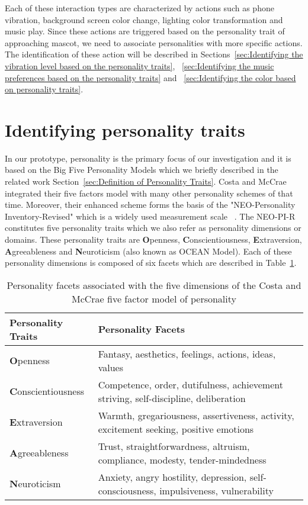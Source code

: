 Each of these interaction types are characterized by actions such as phone vibration,
background screen color change, lighting color transformation and music play.
Since these actions are triggered based on the personality trait of approaching mascot,
we need to associate personalities with more specific actions.
The identification of these action will be described in
Sections~\ref{sec:Identifying the vibration level based on the personality traits},
~\ref{sec:Identifying the music preferences based on the personality traits}
and ~\ref{sec:Identifying the color based on personality traits}.

\section{Identifying personality traits}
\label{sec:Identifying personality traits}

In our prototype, personality is the primary focus of our investigation and
it is based on the Big Five Personality Models which we briefly described
in the related work Section~\ref{sec:Definition of Personality Traits}.
Costa and McCrae integrated their five factors model with many other personality schemes of that time.
Moreover, their enhanced scheme forms the basis of the "NEO-Personality Inventory-Revised"
which is a widely used measurement scale ~\cite{costa2008revised}.
The NEO-PI-R constitutes five personality traits which we also refer as personality dimensions or domains.
These personality traits are \textbf{O}penness, \textbf{C}onscientiousness,
\textbf{E}xtraversion, \textbf{A}greeableness and \textbf{N}euroticism (also known as  OCEAN Model).
Each of these personality dimensions is composed of six facets which are described in Table~\ref{table:personality}.

\begin{table} [h]
\centering
\begin{tabular}{ | m{8em} | m{25em}| }
\hline
\textbf{Personality Traits} & \textbf{Personality Facets}  \\
\hline
\textbf{O}penness & Fantasy, aesthetics, feelings, actions, ideas, values  \\
\hline 
\textbf{C}onscientiousness & Competence, order, dutifulness, achievement striving, self-discipline, deliberation  \\
\hline 
\textbf{E}xtraversion & Warmth, gregariousness, assertiveness, activity, excitement seeking, positive emotions \\
\hline 
\textbf{A}greeableness & Trust, straightforwardness, altruism, compliance, modesty, tender-mindedness  \\
\hline 
\textbf{N}euroticism & Anxiety, angry hostility, depression, self-consciousness, impulsiveness, vulnerability \\
\hline
\end{tabular}
\caption{Personality facets associated with the five dimensions of the Costa and McCrae five factor model of personality}
\label{table:personality}
\end{table}

